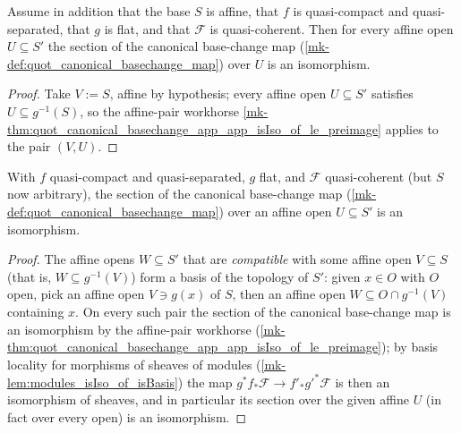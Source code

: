 \begin{theorem}\label{mk-thm:quot_canonical_basechange_app_app_isIso_of_isAffineBase}
  \leanok

  Assume in addition that the base \(S\) is affine, that \(f\) is
  quasi-compact and quasi-separated, that \(g\) is flat, and that
  \(\mathcal{F}\) is quasi-coherent. Then for every affine open
  \(U \subseteq S'\) the section of the canonical base-change map
  (\ref{mk-def:quot_canonical_basechange_map}) over \(U\) is an isomorphism.
\end{theorem}
\begin{proof}
  \leanok{}
  Take \(V := S\), affine by hypothesis; every affine open
  \(U \subseteq S'\) satisfies \(U \subseteq g^{-1}(S)\), so the affine-pair
  workhorse
  \ref{mk-thm:quot_canonical_basechange_app_app_isIso_of_le_preimage}
  applies to the pair \((V, U)\).
\end{proof}

\begin{theorem}\label{mk-thm:quot_canonical_basechange_app_app_isIso_of_isAffineOpen}
  \leanok

  With \(f\) quasi-compact and quasi-separated, \(g\) flat, and
  \(\mathcal{F}\) quasi-coherent (but \(S\) now arbitrary), the section of
  the canonical base-change map (\ref{mk-def:quot_canonical_basechange_map})
  over an affine open \(U \subseteq S'\) is an isomorphism.
\end{theorem}
\begin{proof}
  \leanok{}
  The affine opens \(W \subseteq S'\) that are \emph{compatible} with some
  affine open \(V \subseteq S\) (that is, \(W \subseteq g^{-1}(V)\)) form a
  basis of the topology of \(S'\): given \(x \in O\) with \(O\) open, pick
  an affine open \(V \ni g(x)\) of \(S\), then an affine open
  \(W \subseteq O \cap g^{-1}(V)\) containing \(x\). On every such pair the
  section of the canonical base-change map is an isomorphism by the
  affine-pair workhorse
  (\ref{mk-thm:quot_canonical_basechange_app_app_isIso_of_le_preimage}); by
  basis locality for morphisms of sheaves of modules
  (\ref{mk-lem:modules_isIso_of_isBasis}) the map
  \(g^* f_* \mathcal F \to f'_* g'^* \mathcal F\) is then an isomorphism of
  sheaves, and in particular its section over the given affine \(U\) (in
  fact over every open) is an isomorphism.
\end{proof}

